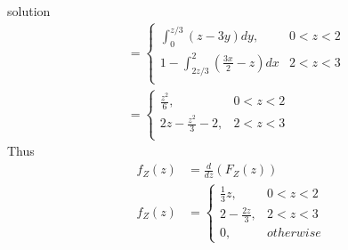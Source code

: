 \documentclass{beamer}
\begin{document}
\begin{frame}{solution}
\begin{align}
&=\begin{cases}
\int_{0}^{z/3}(z-3y)dy , &0 < z < 2\\
1-\int_{2z/3}^{2}(\frac{3x}{2}-z)dx &2 < z < 3\\
\end{cases}\\
&=\begin{cases}
\frac{z^{2}}{6}, &0 < z < 2\\
2z-\frac{z^{2}}{3}-2,&2 < z < 3\\
\end{cases}
\end{align}
Thus\\
\begin{align}
f_{Z}(z)&=\frac{d}{dz}(F_{Z}(z))\\
f_{Z}(z)&=\begin{cases}
\frac{1}{3}z,&0 < z < 2\\
2-\frac{2z}{3},&2 < z < 3\\
0,&otherwise
\end{cases}
\end{align}
\end{frame}
\end{document}
